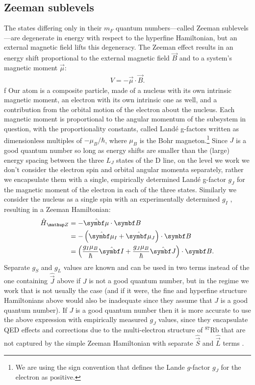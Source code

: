 \subsection{Zeeman sublevels}

The states differing only in their $m_F$ quantum numbers---called Zeeman sublevels---are degenerate in energy with respect to the hyperfine Hamiltonian, but an external magnetic field lifts this degeneracy. The Zeeman effect \cite{zeeman_influence_1897, steck_rubidium_2015} results in an energy shift proportional to the external magnetic field $\vec B$ and to a system's magnetic moment $\vec \mu$:
\begin{align}
V = - \vec\mu\cdot\vec B.
\end{align} f
Our atom is a composite particle, made of a nucleus with its own intrinsic magnetic moment, an electron with its own intrinsic one as well, and a contribution from the orbital motion of the electron about the nucleus. Each magnetic moment is proportional to the angular momentum of the subsystem in question, with the proportionality constants, called Land\'e g-factors written as dimensionless multiples of $-\mu_B/\hbar$, where $\mu_B$ is the Bohr magneton.\footnote{We are using the sign convention that defines the Lande $g$-factor $g_J$ for the electron as positive.} Since $J$ is a good quantum number so long as energy shifts are smaller than the (large) energy spacing between the three $L_J$ states of the D line, on the level we work we don't consider the electron spin and orbital angular momenta separately, rather we encapsulate them with a single, empirically determined Land\'e g-factor $g_J$ \cite{steck_rubidium_2015} for the magnetic moment of the electron in each of the three states. Similarly we consider the nucleus as a single spin with an experimentally determined $g_I$ \cite{steck_rubidium_2015}, resulting in a Zeeman Hamiltonian:
\begin{align}
\hat H_\up{Z} & = -\hat{\vec \mu} \cdot \vec B\\
&= -\left(\hat{\vec \mu}_I + \hat{\vec \mu}_J\right) \cdot \vec B\\
&=\left(\frac{g_I\mu_B}{\hbar} \hat{\vec I} + \frac{g_J\mu_B}{\hbar} \hat{\vec J}\right) \cdot \vec B.\label{eq:H_Z}
\end{align}
Separate $g_S$ and $g_L$ values are known and can be used in two terms instead of the one containing $\hat{\vec J}$ above if $J$ is not a good quantum number, but in the regime we work that is not usually the case (and if it were, the fine and hyperfine structure Hamiltonians above would also be inadequate since they assume that $J$ is a good quantum number). If $J$ is a good quantum number then it is more accurate to use the above expression with empirically measured $g_J$ values, since they encapsulate QED effects and corrections due to the multi-electron structure of $^{87}$Rb that are not captured by the simple Zeeman Hamiltonian with separate $\hat{\vec S}$ and $\hat{\vec L}$ terms \cite{steck_rubidium_2015}. 


